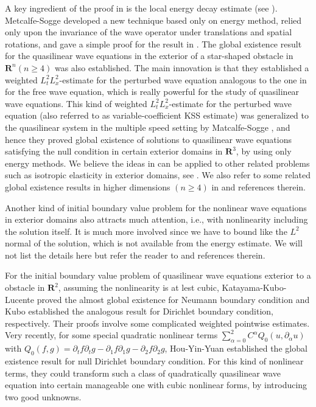 \documentclass[11pt, reqno]{amsart}
\theoremstyle{definition}
\theoremstyle{remark}
\theoremstyle{definition}
\numberwithin{equation}{section}
\newcommand{\R}{\mathbf{R}}
\numberwithin{equation}{section}
\begin{document}
A key ingredient of the proof in \cite{Keel3, Keel1} is the local energy decay estimate (see \cite{LMP63,Mor75}). Metcalfe-Sogge \cite{Metcalfe5} developed a 
new technique based only on energy method, relied only upon the invariance of the wave operator under translations and spatial rotations, and gave a simple 
proof for the result in \cite{Keel2}. The global existence
result for the quasilinear wave equations in the exterior of a star-shaped obstacle in $\R^n (n\ge 4)$ was also established. The main innovation is that they 
established a weighted $L^2_tL^2_x$-estimate for the perturbed wave equation analogous to the one in \cite{Keel2} for the free wave equation, which is really 
powerful for the study of quasilinear wave equations. This kind of weighted $L^2_tL^2_x$-estimate for the
perturbed wave equation (also referred to as variable-coefficient KSS estimate) was generalized to the quasilinear system in the multiple speed setting by 
Matcalfe-Sogge \cite{Metcalfe3}, and hence they proved global existence of solutions to quasilinear wave
equations satisfying the null condition in certain exterior domains in $\R^3$, by using only energy methods. We believe the ideas in \cite{Metcalfe3} can be 
applied to other related problems such as isotropic elasticity in exterior domains, see \cite{Metcalfe1, Metcalfe2, XuL25}. We also refer to some related 
global existence results in higher dimensions $(n\ge 4)$ in \cite{ShT86,Ha95,Metcalfe6} and references therein.

Another kind of initial boundary value problem for the nonlinear wave equations in exterior domains also attracts much attention, i.e., with nonlinearity 
including the solution itself. It is much more involved since we have to bound like the $L^2$ normal of the solution, which is not available from the energy 
estimate. We will not list the details here but refer the reader to \cite{Lin90, Du08, DuZ08, HeM14, HeM141, ZhZ15} and references therein.


For the initial boundary value problem of quasilinear wave equations exterior to a obstacle in $\R^2$, assuming the nonlinearity is at lest cubic, 
Katayama-Kubo-Lucente \cite{Kubo2}  proved the almost global existence for Neumann boundary condition and Kubo \cite{Kubo} established the analogous result for 
Dirichlet boundary condition, respectively. Their proofs involve some complicated weighted pointwise estimates. Very recently, for some special quadratic 
nonlinear terms $\sum_{\alpha=0}^2C^{\alpha}Q_0(u,\partial_{\alpha}u)$ with $Q_0(f,g)=\partial_tf\partial_tg-\partial_1f\partial_1g-\partial_2f\partial_2g$, 
Hou-Yin-Yuan \cite{Hou} established the global existence result for null Dirichlet boundary condition.
 For this kind of nonlinear terms, they could transform such a class of quadratically quasilinear wave equation into certain manageable one with cubic 
 nonlinear forms, by introducing two good unknowns.
\end{document}
